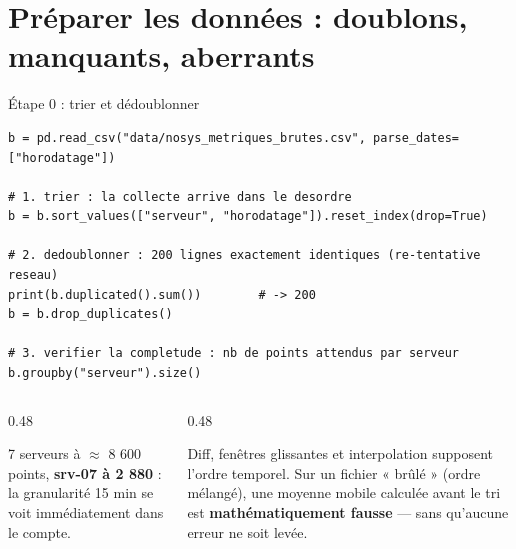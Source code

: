 \section{Préparer les données : doublons, manquants, aberrants}

\begin{frame}[fragile]{Étape 0 : trier et dédoublonner}
\footnotesize%
\begin{codebox}
\begin{lstlisting}
b = pd.read_csv("data/nosys_metriques_brutes.csv", parse_dates=["horodatage"])

# 1. trier : la collecte arrive dans le desordre
b = b.sort_values(["serveur", "horodatage"]).reset_index(drop=True)

# 2. dedoublonner : 200 lignes exactement identiques (re-tentative reseau)
print(b.duplicated().sum())        # -> 200
b = b.drop_duplicates()

# 3. verifier la completude : nb de points attendus par serveur
b.groupby("serveur").size()
\end{lstlisting}
\end{codebox}
\begin{columns}[t]
\begin{column}{0.48\textwidth}
\begin{ebox}
7 serveurs à $\approx$ 8 600 points, \textbf{srv-07 à 2 880} : la
granularité 15 min se voit immédiatement dans le compte.
\end{ebox}
\end{column}
\begin{column}{0.48\textwidth}
\begin{wbox}
Diff, fenêtres glissantes et interpolation supposent l'ordre
temporel. Sur un fichier « brûlé » (ordre mélangé), une moyenne
mobile calculée avant le tri est \textbf{mathématiquement fausse}
--- sans qu'aucune erreur ne soit levée.
\end{wbox}
\end{column}
\end{columns}
\end{frame}

